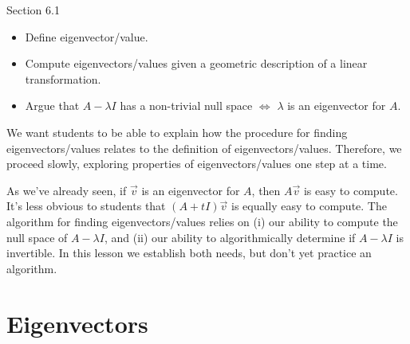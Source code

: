 \begin{lesson}

	Section 6.1

	\begin{itemize}
		\item Define eigenvector/value.
		\item Compute eigenvectors/values given a geometric description of a linear transformation.
		\item Argue that $A-\lambda I$ has a non-trivial null space $\iff$ $\lambda$ is an eigenvector for $A$.
	\end{itemize}

	We want students to be able to explain how the procedure for finding eigenvectors/values
	relates to the definition of eigenvectors/values. Therefore, we proceed slowly, exploring
	properties of eigenvectors/values one step at a time.

	As we've already seen, if $\vec v$ is an eigenvector for $A$, then $A\vec v$ is easy to compute.
	It's less obvious to students that $(A+tI)\vec v$ is equally easy to compute. 
	The algorithm for
	finding eigenvectors/values relies on (i) our ability to compute the null space of $A-\lambda I$,
	and (ii) our ability to algorithmically determine if $A-\lambda I$ is invertible. In this lesson we
	establish both needs, but don't yet practice an algorithm.


\end{lesson}
	\bookonlynewpage
\section*{Eigenvectors}


